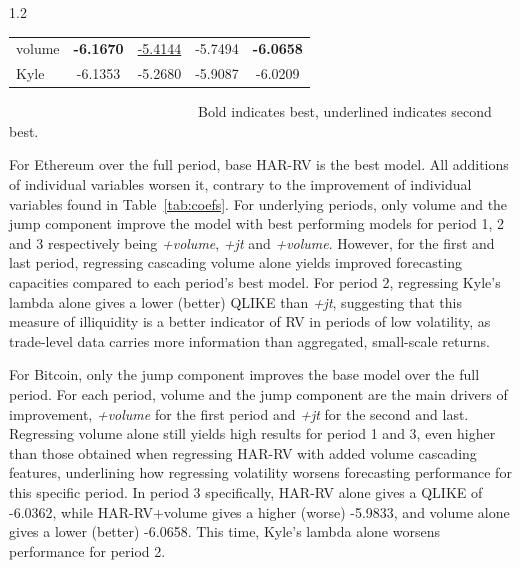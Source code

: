 \documentclass[10pt]{article}
\begin{document}
\begin{setstretch}{1.2}
\begin{table}
\begin{tabular}{lcccc}
volume      & \textbf{-6.1670}     &\underline{-5.4144} & -5.7494             & \textbf{-6.0658} \\
Kyle        & -6.1353             & -5.2680             & -5.9087             & -6.0209 \\
\hline
\end{tabular}
\begin{tablenotes}
\small
\item                            Bold indicates best, underlined indicates second best.
\end{tablenotes}
\end{table}

For Ethereum over the full period, base HAR-RV is the best model. All additions of individual variables worsen it, contrary to the improvement of individual variables found in Table~\ref{tab:coefs}. For underlying periods, only volume and the jump component improve the model with best performing models for period 1, 2 and 3 respectively being \textit{+volume}, \textit{+jt} and \textit{+volume}. However, for the first and last period, regressing cascading volume alone yields improved forecasting capacities compared to each period's best model. For period 2, regressing Kyle's lambda alone gives a lower (better) QLIKE than \textit{+jt}, suggesting that this measure of illiquidity is a better indicator of RV in periods of low volatility, as trade-level data carries more information than aggregated, small-scale returns. 

For Bitcoin, only the jump component improves the base model over the full period. For each period, volume and the jump component are the main drivers of improvement, \textit{+volume} for the first period and \textit{+jt} for the second and last. Regressing volume alone still yields high results for period 1 and 3, even higher than those obtained when regressing HAR-RV with added volume cascading features, underlining how regressing volatility worsens forecasting performance for this specific period. In period 3 specifically, HAR-RV alone gives a QLIKE of -6.0362, while HAR-RV+volume gives a higher (worse) -5.9833, and volume alone gives a lower (better) -6.0658. This time, Kyle's lambda alone worsens performance for period 2.


\end{setstretch}
\end{document}
